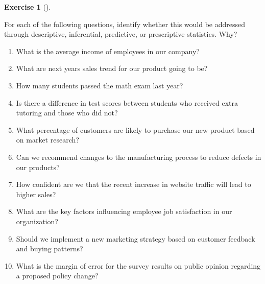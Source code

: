 \documentclass[
  letterpaper,
  DIV=11,
  numbers=noendperiod]{scrreprt}
\providecommand{\tightlist}{%
  \setlength{\itemsep}{0pt}\setlength{\parskip}{0pt}}\usepackage{longtable,booktabs,array}
\theoremstyle{definition}
\newtheorem{exercise}{Exercise}[chapter]
\theoremstyle{definition}
\theoremstyle{definition}
\theoremstyle{remark}
\begin{document}
\begin{exercise}[]\protect\hypertarget{exr-10.5}{}\label{exr-10.5}

For each of the following questions, identify whether this would be
addressed through descriptive, inferential, predictive, or prescriptive
statistics. Why?

\begin{enumerate}
\def\labelenumi{\alph{enumi}.}
\tightlist
\item
  What is the average income of employees in our company?
\item
  What are next years sales trend for our product going to be?
\item
  How many students passed the math exam last year?
\item
  Is there a difference in test scores between students who received
  extra tutoring and those who did not?
\item
  What percentage of customers are likely to purchase our new product
  based on market research?
\item
  Can we recommend changes to the manufacturing process to reduce
  defects in our products?
\item
  How confident are we that the recent increase in website traffic will
  lead to higher sales?
\item
  What are the key factors influencing employee job satisfaction in our
  organization?
\item
  Should we implement a new marketing strategy based on customer
  feedback and buying patterns?
\item
  What is the margin of error for the survey results on public opinion
  regarding a proposed policy change?
\end{enumerate}

\end{exercise}
\end{document}
